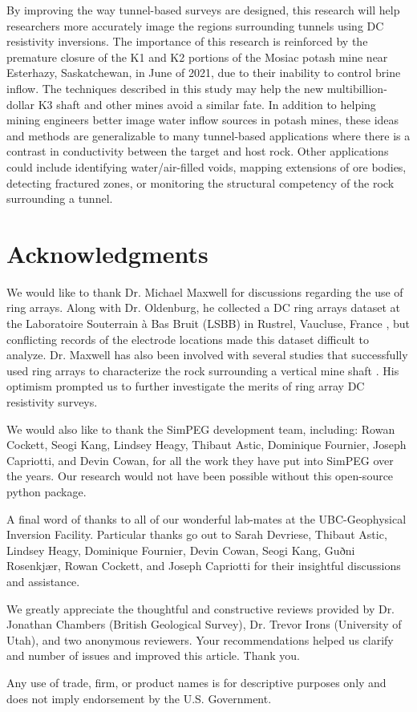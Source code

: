 \documentclass[preprint,authoryear,12pt]{elsarticle}
\newcommand{\IcelandicDh}{\textnormal{ð}}
\begin{document}
By improving the way tunnel-based surveys are designed, this research will help researchers more accurately image the regions surrounding tunnels using DC resistivity inversions. The importance of this research is reinforced by the premature closure of the K1 and K2 portions of the Mosiac potash mine near Esterhazy, Saskatchewan, in June of 2021, due to their inability to control brine inflow. The techniques described in this study may help the new multibillion-dollar K3 shaft and other mines avoid a similar fate. In addition to helping mining engineers better image water inflow sources in potash mines, these ideas and methods are generalizable to many tunnel-based applications where there is a contrast in conductivity between the target and host rock. Other applications could include identifying water/air-filled voids, mapping extensions of ore bodies, detecting fractured zones, or monitoring the structural competency of the rock surrounding a tunnel.


\section{Acknowledgments}
\label{Acknowledgments}
We would like to thank Dr. Michael Maxwell for discussions regarding the use of ring arrays. Along with Dr. Oldenburg, he collected a DC ring arrays dataset at the Laboratoire Souterrain \`a Bas Bruit (LSBB) in Rustrel, Vaucluse, France \citep{Maxwell2010}, but conflicting records of the electrode locations made this dataset difficult to analyze. Dr. Maxwell has also been involved with several studies that successfully used ring arrays to characterize the rock surrounding a vertical mine shaft \citep{Eso2006b,Cisyk2014,Maxwell2016}. His optimism prompted us to further investigate the merits of ring array DC resistivity surveys.

We would also like to thank the SimPEG development team, including: Rowan Cockett, Seogi Kang, Lindsey Heagy, Thibaut Astic, Dominique Fournier, Joseph Capriotti, and Devin Cowan, for all the work they have put into SimPEG over the years. Our research would not have been possible without this open-source python package.

A final word of thanks to all of our wonderful lab-mates at the UBC-Geophysical Inversion Facility. Particular thanks go out to Sarah Devriese, Thibaut Astic, Lindsey Heagy, Dominique Fournier, Devin Cowan, Seogi Kang, Gu\IcelandicDh ni Rosenkj\ae r, Rowan Cockett, and Joseph Capriotti for their insightful discussions and assistance.

We greatly appreciate the thoughtful and constructive reviews provided by Dr. Jonathan Chambers (British Geological Survey), Dr. Trevor Irons (University of Utah), and two anonymous reviewers. Your recommendations helped us clarify and number of issues and improved this article. Thank you.

Any use of trade, firm, or product names is for descriptive purposes only and does not imply endorsement by the U.S. Government.



% 

\end{document}
